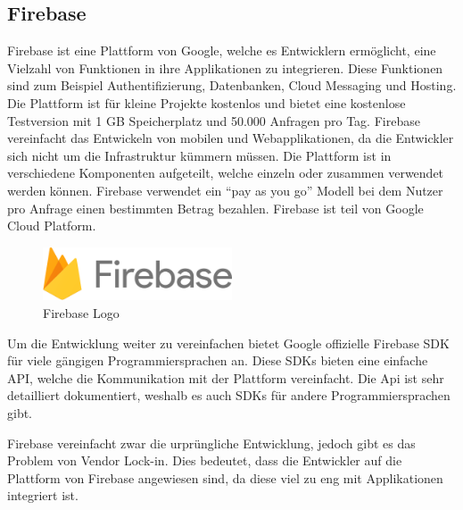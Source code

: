 ﻿\subsection{Firebase}
\label{sec:firebase}

Firebase ist eine Plattform von Google, welche es Entwicklern ermöglicht, eine Vielzahl von Funktionen in ihre Applikationen zu integrieren. Diese Funktionen sind zum Beispiel Authentifizierung, Datenbanken, Cloud Messaging und Hosting. Die Plattform ist für kleine Projekte kostenlos und bietet eine kostenlose Testversion mit 1 GB Speicherplatz und 50.000 Anfragen pro Tag. Firebase vereinfacht das Entwickeln von mobilen und Webapplikationen, da die Entwickler sich nicht um die Infrastruktur kümmern müssen. Die Plattform ist in verschiedene Komponenten aufgeteilt, welche einzeln oder zusammen verwendet werden können. Firebase verwendet ein \enquote{pay as you go} Modell bei dem Nutzer pro Anfrage einen bestimmten Betrag bezahlen. Firebase ist teil von Google Cloud Platform.

\begin{figure}[h]
  \centering
  \includegraphics[width=0.5\textwidth]{images/firebase_logo}
  \caption{Firebase Logo }
  \label{fig:firebase_logo}
\end{figure}

Um die Entwicklung weiter zu vereinfachen bietet Google offizielle Firebase \ac{SDK} für viele gängigen Programmiersprachen an. Diese SDKs bieten eine einfache \ac{API}, welche die Kommunikation mit der Plattform vereinfacht. Die Api ist sehr detailliert dokumentiert, weshalb es auch SDKs für andere Programmiersprachen gibt.

Firebase vereinfacht zwar die urprüngliche Entwicklung, jedoch gibt es das Problem von Vendor Lock-in. Dies bedeutet, dass die Entwickler auf die Plattform von Firebase angewiesen sind, da diese viel zu eng mit Applikationen integriert ist.
